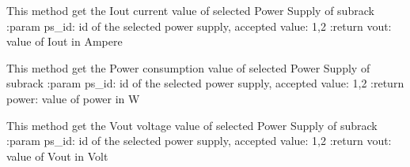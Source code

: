 \documentclass[letterpaper,10pt,english]{sphinxmanual}
\begin{document}
\begin{fulllineitems}
\begin{fulllineitems}
\end{fulllineitems}


\begin{fulllineitems}
\label{\detokenize{apidocs:subrack_management_board.SubrackMngBoard.GetPSIout}}
\pysigstartsignatures
{}
\pysigstopsignatures
\sphinxAtStartPar
This method get the Iout current value of selected Power Supply of subrack
:param ps\_id: id of the selected power supply, accepted value: 1,2
:return vout: value of Iout in Ampere

\end{fulllineitems}


\begin{fulllineitems}
\label{\detokenize{apidocs:subrack_management_board.SubrackMngBoard.GetPSPower}}
\pysigstartsignatures
{}
\pysigstopsignatures
\sphinxAtStartPar
This method get the Power consumption value of selected Power Supply of subrack
:param ps\_id: id of the selected power supply, accepted value: 1,2
:return power: value of power in W

\end{fulllineitems}


\begin{fulllineitems}
\label{\detokenize{apidocs:subrack_management_board.SubrackMngBoard.GetPSVout}}
\pysigstartsignatures
{}
\pysigstopsignatures
\sphinxAtStartPar
This method get the Vout voltage value of selected Power Supply of subrack
:param ps\_id: id of the selected power supply, accepted value: 1,2
:return vout: value of Vout in Volt

\end{fulllineitems}


\end{fulllineitems}
\end{document}
